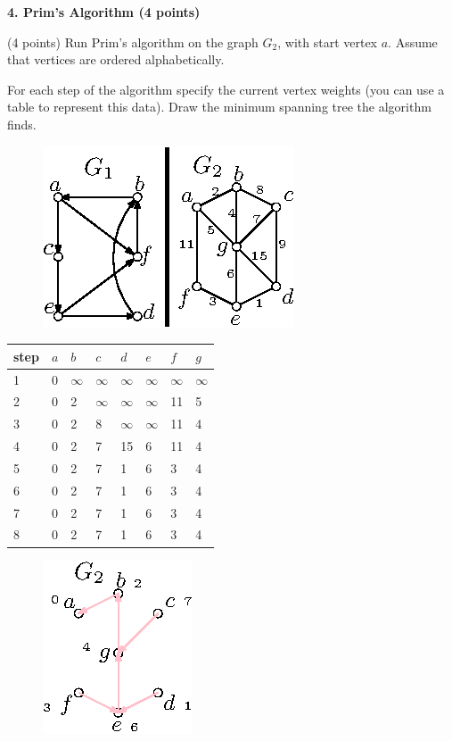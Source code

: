\documentclass[12pt]{elsart}
\begin{document}
{\bf 4.  Prim's Algorithm (4 points)}

(4 points) Run Prim’s algorithm on the graph $G_2$, with start vertex $a$. Assume that vertices are ordered alphabetically. 

For each step of the algorithm specify the current vertex weights (you can use a table to represent this data).  Draw the minimum spanning tree the algorithm finds. 

\begin{figure}[h]
	\centering \includegraphics[width=.45\textwidth]{Graph-01}
\end{figure}

\begin{tabular}{|l|l|l|l|l|l|l|l|}
  \hline
  step & $a$ & $b$ & $c$ & $d$ & $e$ & $f$ &  $g$\\
  \hline
  1 & 0 & $\infty$ & $\infty$ & $\infty$ & $\infty$ & $\infty$ & $\infty$\\
  \hline
  2 & \cellcolor{blue!25} 0 & 2 & $\infty$ & $\infty$ & $\infty$ & 11 & 5\\
  \hline
  3 & \cellcolor{blue!25} 0 & \cellcolor{blue!25} 2 & 8 & $\infty$ & $\infty$ & 11 & 4\\
  \hline
  4 & \cellcolor{blue!25} 0 & \cellcolor{blue!25} 2 & 7 & 15 & 6 & 11 & \cellcolor{blue!25} 4\\
  \hline
  5 & \cellcolor{blue!25} 0 & \cellcolor{blue!25} 2 & 7 & 1 & \cellcolor{blue!25} 6 & 3 & \cellcolor{blue!25} 4\\
  \hline
  6 & \cellcolor{blue!25} 0 & \cellcolor{blue!25} 2 & 7 & \cellcolor{blue!25} 1 & \cellcolor{blue!25} 6 & 3 & \cellcolor{blue!25} 4\\
  \hline
  7 & \cellcolor{blue!25} 0 & \cellcolor{blue!25} 2 & 7 & \cellcolor{blue!25} 1 & \cellcolor{blue!25} 6 & \cellcolor{blue!25} 3 & \cellcolor{blue!25} 4\\
  \hline
  8 & \cellcolor{blue!25} 0 & \cellcolor{blue!25} 2 & \cellcolor{blue!25} 7 & \cellcolor{blue!25} 1 & \cellcolor{blue!25} 6 & \cellcolor{blue!25} 3 & \cellcolor{blue!25} 4\\
  \hline
\end{tabular}

\begin{figure}
  \centering \includegraphics[width=.45\textwidth]{Graph-04}
\end{figure}
\end{document}
